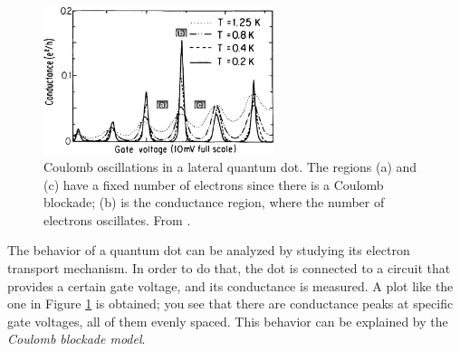 \documentclass[a4paper,twoside,11pt]{book}
\begin{document}
\begin{figure}[h]%
	\centering
    \includegraphics[width=0.60\textwidth]{Figure_6_Reimann}
    \caption{Coulomb oscillations in a lateral quantum dot. The regions (a) and (c) have a fixed number of electrons since there is a Coulomb blockade; (b) is the conductance region, where the number of electrons oscillates. From \cite{Reimann2002}.}
	\label{fig:Figure_6_Reimann}
\end{figure}

The behavior of a quantum dot can be analyzed by studying its electron transport mechanism. In order to do that, the dot is connected to a circuit that provides a certain gate voltage, and its conductance is measured. A plot like the one in Figure \ref{fig:Figure_6_Reimann} is obtained; you see that there are conductance peaks at specific gate voltages, all of them evenly spaced. This behavior can be explained by the \emph{Coulomb blockade model}.

\newcommand{\trcomponent}[2]
{
	\draw (#1) node[align=center] {\textnormal #2};
}

\newcommand{\circlecomp}[2]
{
	\draw[thick] (#1) node[draw,shape=circle,scale=0.85,align=center] {#2};
}

\newcommand{\vertcomp}[2]
{
\draw[thick] (#1) node[draw,shape=rectangle,scale=1,align=center] {\textnormal #2};
}
\end{document}
